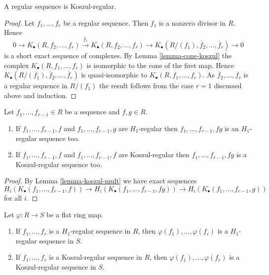 \begin{lemma}
\label{lemma-regular-koszul-regular}
A regular sequence is Koszul-regular.
\end{lemma}

\begin{proof}
Let $f_1, \ldots, f_r$ be a regular sequence. Then $f_1$ is a nonzero
divisor in $R$. Hence
$$
0 \to K_\bullet(R, f_2, \ldots, f_r) \xrightarrow{f_1}
K_\bullet(R, f_2, \ldots, f_r) \to
K_\bullet(R/(f_1), \overline{f}_2, \ldots, \overline{f}_r) \to 0
$$
is a short exact sequence of complexes. By
Lemma \ref{lemma-cone-koszul}
the complex $K_\bullet(R, f_1, \ldots, f_r)$
is isomorphic to the cone of the first map. Hence
$K_\bullet(R/(f_1), \overline{f}_2, \ldots, \overline{f}_r)$
is quasi-isomorphic to $K_\bullet(R, f_1, \ldots, f_r)$.
As $\overline{f}_2, \ldots, \overline{f}_r$ is a regular sequence
in $R/(f_1)$ the result follows from the case $r = 1$ discussed above and
induction.
\end{proof}

\begin{lemma}
\label{lemma-mult-koszul-regular}
Let $f_1, \ldots, f_{r - 1} \in R$ be a sequence and $f, g \in R$.
\begin{enumerate}
\item If $f_1, \ldots, f_{r - 1}, f$ and $f_1, \ldots, f_{r - 1}, g$
are $H_1$-regular then $f_1, \ldots, f_{r - 1}, fg$ is an
$H_1$-regular sequence too.
\item If $f_1, \ldots, f_{r - 1}, f$ and $f_1, \ldots, f_{r - 1}, f$ are
Koszul-regular then $f_1, \ldots, f_{r - 1}, fg$ is a Koszul-regular
sequence too.
\end{enumerate}
\end{lemma}

\begin{proof}
By
Lemma \ref{lemma-koszul-mult}
we have exact sequences
$$
H_i(K_\bullet(f_1, \ldots, f_{r - 1}, f)) \to
H_i(K_\bullet(f_1, \ldots, f_{r - 1}, fg)) \to
H_i(K_\bullet(f_1, \ldots, f_{r - 1}, g))
$$
for all $i$.
\end{proof}

\begin{lemma}
\label{lemma-koszul-regular-flat-base-change}
Let $\varphi : R \to S$ be a flat ring map.
\begin{enumerate}
\item If $f_1, \ldots, f_r$ is a $H_1$-regular sequence in $R$, then
$\varphi(f_1), \ldots, \varphi(f_r)$ is a $H_1$-regular sequence in $S$.
\item If $f_1, \ldots, f_r$ is a Koszul-regular sequence in $R$, then
$\varphi(f_1), \ldots, \varphi(f_r)$ is a Koszul-regular sequence in $S$.
\end{enumerate}
\end{lemma}

